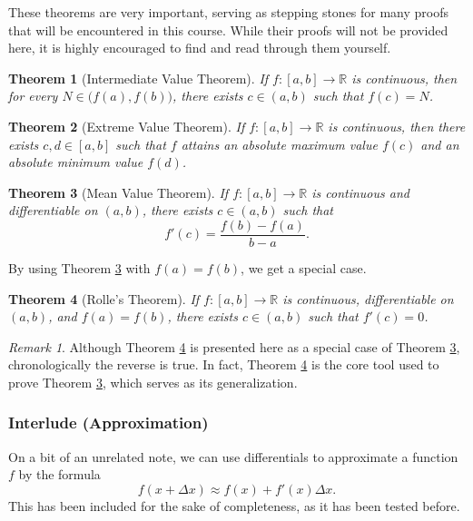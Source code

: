\documentclass[11pt]{scrartcl}
\theoremstyle{plain}
\newtheorem{theorem}{Theorem}[section]
\theoremstyle{definition}
\theoremstyle{remark}
\newtheorem*{remark}{Remark}
\begin{document}
These theorems are very important, serving as stepping stones for many proofs that will be encountered in
this course. While their proofs will not be provided here, it is highly encouraged to find and read through 
them yourself.

\begin{theorem}[Intermediate Value Theorem]
    If $f\colon[a,b]\to \mathbb{R}$ is continuous, then for every $N\in\bigl(f(a),f(b)\bigr)$, there exists 
    $c\in(a,b)$ such that $f(c)=N$.
\end{theorem}

\begin{theorem}[Extreme Value Theorem]
    If $f\colon[a,b]\to \mathbb{R}$ is continuous, then there exists $c,d\in[a,b]$ such that $f$ attains an 
    absolute maximum value $f(c)$ and an absolute minimum value $f(d)$.
\end{theorem}

\begin{theorem}[Mean Value Theorem] \label{thm:mvt}
    If $f\colon[a,b]\to \mathbb{R}$ is continuous and differentiable on $(a,b)$, there exists $c\in(a,b)$ 
    such that \[ f'(c)= \frac{{f(b)-f(a)}}{b-a}. \]
\end{theorem}

By using Theorem \ref{thm:mvt} with $f(a)=f(b)$, we get a special case.

\begin{theorem}[Rolle's Theorem] \label{thm:rolle}
    If $f\colon[a,b]\to \mathbb{R}$ is continuous, differentiable on $(a,b)$, and $f(a)=f(b)$, there exists 
    $c\in(a,b)$ such that $f'(c)=0$.
\end{theorem}

\begin{remark}
    Although Theorem \ref{thm:rolle} is presented here as a special case of Theorem \ref{thm:mvt}, 
    chronologically the reverse is true. In fact, Theorem \ref{thm:rolle} is the core tool used to prove 
    Theorem \ref{thm:mvt}, which serves as its generalization.
\end{remark}

\subsubsection{Interlude (Approximation)}

On a bit of an unrelated note, we can use differentials to approximate a function $f$ by the formula
\[ f(x+\Delta x)\approx f(x)+f'(x)\Delta x. \]
This has been included for the sake of completeness, as it has been tested before.
\end{document}
